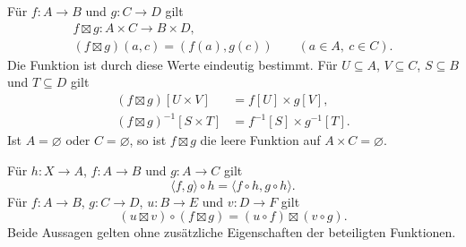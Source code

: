 \begin{theorem}
\label{b05guide:thm:product-function}
Für $f\colon A\to B$ und $g\colon C\to D$ gilt
\[
 \begin{gathered}
 f\boxtimes g\colon A\times C\to B\times D,\\
 (f\boxtimes g)(a,c)=(f(a),g(c))
       \qquad(a\in A,\ c\in C).
 \end{gathered}
\]
Die Funktion ist durch diese Werte eindeutig bestimmt.
Für $U\subseteq A$, $V\subseteq C$, $S\subseteq B$
und $T\subseteq D$ gilt
\[
 \begin{aligned}
 (f\boxtimes g)[U\times V]&=f[U]\times g[V],\\
 (f\boxtimes g)^{-1}[S\times T]
     &=f^{-1}[S]\times g^{-1}[T].
 \end{aligned}
\]
Ist $A=\varnothing$ oder $C=\varnothing$, so ist
$f\boxtimes g$ die leere Funktion auf $A\times C=\varnothing$.
\end{theorem}

\begin{theorem}
\label{b05guide:thm:pair-product-composition}
Für $h\colon X\to A$, $f\colon A\to B$ und $g\colon A\to C$
gilt
\[
 \langle f,g\rangle\circ h
     =\langle f\circ h,g\circ h\rangle.
\]
Für $f\colon A\to B$, $g\colon C\to D$,
$u\colon B\to E$ und $v\colon D\to F$ gilt
\[
 (u\boxtimes v)\circ(f\boxtimes g)
       =(u\circ f)\boxtimes(v\circ g).
\]
Beide Aussagen gelten ohne zusätzliche Eigenschaften
der beteiligten Funktionen.
\end{theorem}

